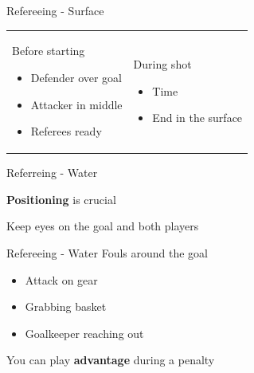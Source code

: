 \documentclass{beamer}
\begin{document}
    \begin{frame}{Refereeing - Surface}
        \begin{tabular}{ll}
            \parbox{0.5\textwidth}
            {
                \begin{center}
                    Before starting
                \end{center}
                \begin{itemize}
                    \item Defender over goal
                    \item Attacker in middle
                    \item Referees ready
                \end{itemize}
            }
            &
            \parbox{0.5\textwidth}
            {
                \begin{center}
                    During shot
                \end{center}
                \begin{itemize}
                    \item Time
                    \item End in the surface
                \end{itemize}
            }
        \end{tabular}
    \end{frame}

    \begin{frame}{Referreing - Water}
        \begin{center}
            \textbf{Positioning} is crucial \pause

            Keep eyes on the goal and both players
        \end{center}
    \end{frame}

    \begin{frame}{Refereeing - Water}
        Fouls around the goal
        \begin{itemize}
            \item Attack on gear
            \item Grabbing basket
            \item Goalkeeper reaching out
        \end{itemize}

        \pause

        You can play \textbf{advantage} during a penalty
    \end{frame}
\end{document}
